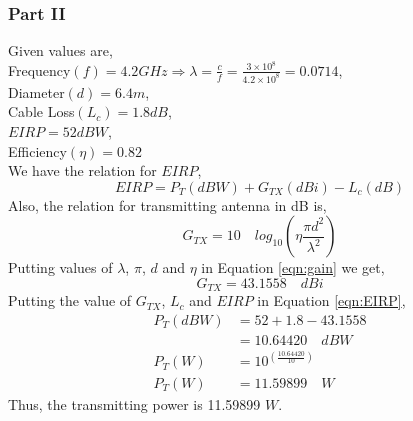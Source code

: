 \documentclass{home_assignment}
\begin{document}
{    \subsubsection*{Part II}
    Given values are,\\
    Frequency$(f)=4.2 GHz\Rightarrow \lambda=\frac{c}{f}=\frac{3 \times 10^8}{4.2 \times 10^8}=0.0714$,\\
    Diameter$(d)=6.4m$,\\
    Cable Loss$(L_c)=1.8 dB$,\\
    $EIRP=52dBW$,\\
    Efficiency$(\eta)=0.82$\\
    We have the relation for $EIRP$,
    \begin{equation}
        EIRP=P_T(dBW)+G_{TX}(dBi)-L_c(dB)
        \label{eqn:EIRP}
    \end{equation}
    Also, the relation for transmitting antenna in dB is,
    \begin{equation}
        G_{TX}=10 \quad log_{10}\left(\eta\frac{\pi d^2}{\lambda^2}\right)
        \label{eqn:gain}
    \end{equation}
    Putting values of $\lambda$, $\pi$, $d$ and $\eta$ in Equation \ref{eqn:gain} we get,
    \begin{equation*}
        G_{TX}=43.1558\quad dBi
    \end{equation*}
    Putting the value of $G_{TX}$, $L_c$ and $EIRP$ in Equation \ref{eqn:EIRP},
    \begin{equation*}
        \begin{aligned}
            P_T(dBW)&=52+1.8-43.1558\\
            &=10.64420\quad dBW\\
            P_T(W)&=10^{\left(\frac{10.64420}{10}\right)}\\
            P_T(W)&=11.59899 \quad W
        \end{aligned}
    \end{equation*}
    Thus, the transmitting power is 11.59899 $W$.
    }
\end{document}
